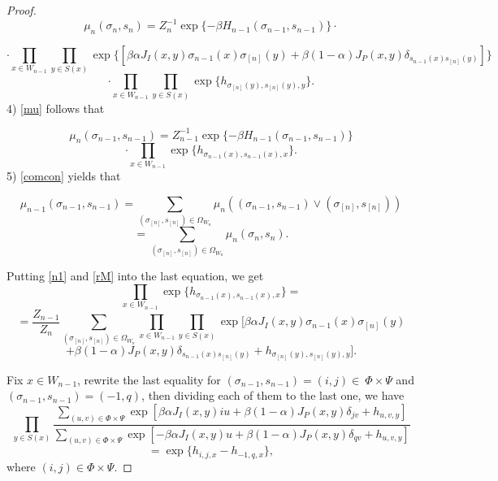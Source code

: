 \documentclass[10pt,a4paper]{amsart}
\begin{document}
\begin{proof}
$$\mu_{n}(\sigma_n, s_n)=Z_n^{-1}\exp\{-\beta H_{n-1}(\sigma_{n-1},s_{n-1})\}\cdot$$

$$\cdot\prod_{x\in W_{n-1}}\prod_{y\in S(x)}\exp\{\left[\beta \alpha  J_{I}(x,y)\sigma_{n-1}(x)\sigma_{[n]}(y)
+\beta (1-\alpha) J_{P}(x,y)\delta_{s_{n-1}(x)s_{[n]}(y)}\right]\}$$
\begin{equation}\label{rM}\cdot\prod_{x\in W_{n-1}}\prod_{y\in S(x)}\exp\{ h_{\sigma_{[n]}(y),s_{[n]}(y),y}\}.
\end{equation}
4) \eqref{mu} follows that

$$\mu_{n}(\sigma_{n-1}, s_{n-1})=Z_{n-1}^{-1}\exp\{-\beta H_{n-1}(\sigma_{n-1},s_{n-1})\}$$
\begin{equation}\label{n1}\cdot\prod_{x\in
W_{n-1}}\exp\{h_{\sigma_{n-1}(x),s_{n-1}(x),x}\}.
\end{equation}
5) \eqref{comcon} yields that

 $$\mu _{n -1}(\sigma_{n-1}, s_{n-1})=\sum\limits_{(\sigma_{[n]}, s_{[n]})\in \Omega _{W_n}} \mu
_{n}((\sigma_{n-1}, s_{n-1}) \vee (\sigma_{[n]}, s_{[n]}))$$$$=\sum\limits_{(\sigma_{[n]}, s_{[n]})  \in {\Omega _{W_n}}} \mu
_{n}(\sigma_n,s_n).$$

Putting \eqref{n1} and \eqref{rM} into the last equation, we get
$$\prod _{x\in
W_{n-1}}\exp\{h_{\sigma_{n-1}(x),s_{n-1}(x),x}\}=$$
$$=\frac{Z_{n-1}}{Z_n}\sum\limits_{(\sigma_{[n]}, s_{[n]})  \in {\Omega _{W_n}}} \prod_{x\in W_{n-1}}\prod_{y\in S(x)}\exp[\beta \alpha  J_{I}(x,y)\sigma_{n-1}(x)\sigma_{[n]}(y)$$
\begin{equation}\label{cc3}
+\beta (1-\alpha) J_{P}(x,y)\delta_{s_{n-1}(x)s_{[n]}(y)}+ h_{\sigma_{[n]}(y),s_{[n]}(y),y}].
\end{equation}

Fix $x\in W_{n-1}$, rewrite the last equality for $(\sigma_{n-1},s_{n-1})=(i,j)\in\ \Phi\times\Psi$ and $(\sigma_{n-1},s_{n-1})=(-1,q)$, then dividing each of them to the last one, we have
$$
\prod\limits_{y\in S(x)}\frac{\sum\limits_{(u,v)\in \Phi\times\Psi}\exp\left[\beta \alpha  J_{I}(x,y)iu
+\beta (1-\alpha) J_{P}(x,y)\delta_{jv}+ h_{u,v,y}\right]}{\sum\limits_{(u,v)\in \Phi\times\Psi}\exp\left[-\beta \alpha  J_{I}(x,y)u
+\beta (1-\alpha) J_{P}(x,y)\delta_{qv}+ h_{u,v,y}\right]}$$
\begin{equation}\label{mainone}=\exp\{h_{i,j,x}-h_{-1,q,x}\},
\end{equation}
where $(i,j)\in\Phi\times\Psi$.


\end{proof}
\end{document}
